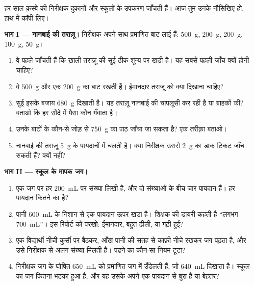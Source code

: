 \begin{problem}\label{pb:g6:measurement-in-science:1}
हर साल क़स्बे की निरीक्षक दुकानों और स्कूलों के उपकरण जाँचती हैं। आज
तुम उनके नौसिखिए हो, हाथ में कॉपी लिए।

\medskip\noindent\textbf{भाग I --- नानबाई की तराज़ू।}
निरीक्षक अपने साथ प्रमाणित बाट लाई हैं: \qty{500}{g},
\qty{200}{g}, \qty{200}{g}, \qty{100}{g}, \qty{50}{g}।
\begin{enumerate}
  \item वे पहले जाँचती हैं कि ख़ाली तराज़ू की सुई ठीक शून्य पर खड़ी
        है। यह सबसे पहली जाँच क्यों होनी चाहिए?
  \item वे \qty{500}{g} और एक \qty{200}{g} का बाट रखती हैं।
        ईमानदार तराज़ू को क्या दिखाना चाहिए?
  \item सुई इसके बजाय \qty{680}{g} दिखाती है। यह तराज़ू नानबाई की
        चापलूसी कर रही है या ग्राहकों की? बताओ कि हर सौदे में पैसा
        कौन गँवाता है।
  \item उनके बाटों के कौन-से जोड़ से \qty{750}{g} का पाठ जाँचा जा
        सकता है? एक तरीक़ा बताओ।
  \item नानबाई की तराज़ू \qty{5}{g} के पायदानों में चलती है। क्या
        निरीक्षक उससे \qty{2}{g} का डाक टिकट जाँच सकती हैं? क्यों
        नहीं?
\end{enumerate}

\medskip\noindent\textbf{भाग II --- स्कूल के मापक जग।}
\begin{enumerate}[resume]
  \item एक जग पर हर \qty{200}{mL} पर संख्या लिखी है, और दो
        संख्याओं के बीच चार पायदान हैं। हर पायदान कितने का है?
  \item पानी \qty{600}{mL} के निशान से एक पायदान ऊपर खड़ा है।
        शिक्षक की डायरी कहती है ``लगभग \qty{700}{mL}''। इस रिपोर्ट
        को परखो: ईमानदार, बहुत ढीली, या गढ़ी हुई?
  \item एक विद्यार्थी नीची कुर्सी पर बैठकर, आँख पानी की सतह से
        काफ़ी नीचे रखकर जग पढ़ता है, और उसे निरीक्षक से अलग संख्या
        मिलती है। पढ़ने का कौन-सा नियम टूटा?
  \item निरीक्षक जग के घोषित \qty{650}{mL} को प्रमाणित जग में
        उँडेलती हैं, जो \qty{640}{mL} दिखाता है। स्कूल का जग कितना
        भटका हुआ है, और यह उसके अपने एक पायदान से बुरा है या बेहतर?
\end{enumerate}


\end{problem}
